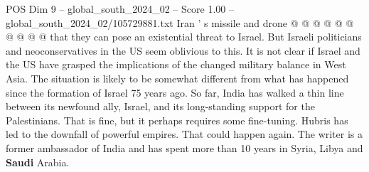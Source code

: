 \begin{textsample}{POS Dim 9 – global\_south\_2024\_02 – Score 1.00 – global\_south\_2024\_02/105729881.txt}
Iran ' s missile and drone @ @ @ @ @ @ @ @ @ @ that they can pose an existential threat to Israel.
But Israeli politicians and neoconservatives in the US seem oblivious to this.
It is not clear if Israel and the US have grasped the implications of the changed military balance in West Asia.
The situation is likely to be somewhat different from what has happened since the formation of Israel 75 years ago.
So far, India has walked a thin line between its newfound ally, Israel, and its long-standing support for the Palestinians.
That is fine, but it perhaps requires some fine-tuning.
Hubris has led to the downfall of powerful empires.
That could happen again.
The writer is a former ambassador of India and has spent more than 10 years in Syria, Libya and \textbf{Saudi} Arabia.

\end{textsample}
